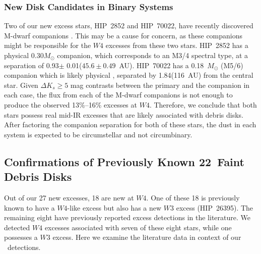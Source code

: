 

	\subsubsection{New Disk Candidates in Binary Systems}

     Two of our new excess stars, HIP~2852 and HIP~70022, have recently discovered M-dwarf companions \citep{DeRosa2014}.  This may be a cause for concern, as these companions might be responsible for the $W4$ excesses from these two stars. HIP~2852 has a physical 0.30$M_\odot$ companion, which corresponds to an M3/4 spectral type, at a separation of 0.93\arcsec$\pm$ 0.01\arcsec ($45.6\pm0.49$~AU). HIP~70022 has a 0.18~$M_\odot$ (M5/6) companion which is likely physical \citep{DeRosapc2014,DeRosa2014}, separated by 1.84\arcsec (116~AU) from the central star. 
Given $\Delta K_s\geq5$ mag contrasts between the primary and the companion in each case, the flux from each of the M-dwarf companions is not enough to produce the observed 13\%--16\% excesses at $W4$.  Therefore, we conclude that both stars possess real mid-IR excesses that are likely associated with debris disks. After factoring the companion separation for both of these stars, the dust in each system is expected to be circumstellar and not circumbinary.
    
        \subsection{Confirmations of Previously Known 22\micron\ Faint Debris Disks}
        \label{sec:confirmed_disks}



    
    Out of our 27 %
    new excesses, 18 are new at $W4$. One of these 18 is previously known to have a $W4$-like excess but also has a new $W3$ excess (HIP~26395). The remaining eight %
    have previously reported excess detections in the literature. We detected $W4$ excesses associated with seven of these eight stars, while one possesses a $W3$ excess. Here we examine the literature data in context of our \WS\ detections. 


